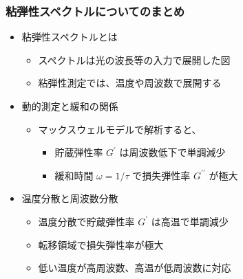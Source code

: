 \documentclass[12pt, dvipdfmx]{beamer}
\begin{document}
\begin{frame}
	\frametitle{粘弾性スペクトルについてのまとめ}
        \begin{boxnote}
            \vspace{-3mm}
            \begin{itemize}
                \item 粘弾性スペクトルとは
                    \begin{itemize}
                        \item スペクトルは光の波長等の入力で展開した図
                        \item 粘弾性測定では、温度や周波数で展開する
                    \end{itemize} 
                \item 動的測定と緩和の関係
                    \begin{itemize}
                        \item マックスウェルモデルで解析すると、
                        \begin{itemize}
							\item 貯蔵弾性率 $G^{\prime}$ は周波数低下で単調減少
							\item 緩和時間 $\omega = 1/\tau$ で損失弾性率 $G^{\prime\prime}$ が極大
						\end{itemize}
                    \end{itemize} 
                \item 温度分散と周波数分散
                    \begin{itemize}
                        \item 温度分散で貯蔵弾性率 $G^{\prime}$ は高温で単調減少
                        \item 転移領域で損失弾性率が極大
                        \item 低い温度が高周波数、高温が低周波数に対応
                    \end{itemize}
            \end{itemize}
        \end{boxnote}
\end{frame}
\end{document}
